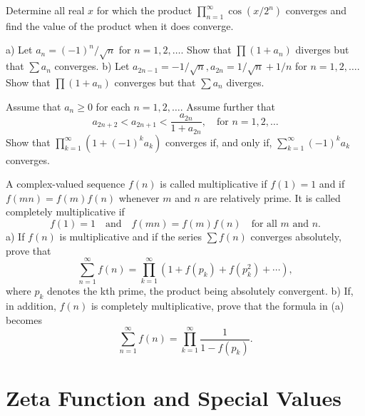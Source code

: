     \begin{problembox}
    Determine all real \(x\) for which the product \(\prod_{n=1}^{\infty} \cos (x/2^n)\) converges and find the value of the product when it does converge.
    \end{problembox}
    
    \begin{problembox}
    a) Let \(a_n = (-1)^n/\sqrt{n}\) for \(n = 1, 2, \ldots\). Show that \(\prod (1 + a_n)\) diverges but that \(\sum a_n\) converges.
    b) Let \(a_{2n-1} = -1/\sqrt{n}, a_{2n} = 1/\sqrt{n} + 1/n\) for \(n = 1, 2, \ldots\). Show that \(\prod (1 + a_n)\) converges but that \(\sum a_n\) diverges.
    \end{problembox}
    
    \begin{problembox}
    Assume that \(a_n \geq 0\) for each \(n = 1, 2, \ldots\). Assume further that
    \[a_{2n+2} < a_{2n+1} < \frac{a_{2n}}{1 + a_{2n}}, \quad \text{for } n = 1, 2, \ldots\]
    Show that \(\prod_{k=1}^{\infty} (1 + (-1)^k a_k)\) converges if, and only if, \(\sum_{k=1}^{\infty} (-1)^k a_k\) converges.
    \end{problembox}
    
    \begin{problembox}
    A complex-valued sequence \(f(n)\) is called multiplicative if \(f(1) = 1\) and if \(f(mn) = f(m)f(n)\) whenever \(m\) and \(n\) are relatively prime. It is called completely multiplicative if
    \[f(1) = 1 \quad \text{and} \quad f(mn) = f(m)f(n) \quad \text{for all } m \text{ and } n.\]
    a) If \(f(n)\) is multiplicative and if the series \(\sum f(n)\) converges absolutely, prove that
    \[\sum_{n=1}^{\infty} f(n) = \prod_{k=1}^{\infty} (1 + f(p_k) + f(p_k^2) + \cdots),\]
    where \(p_k\) denotes the kth prime, the product being absolutely convergent.
    b) If, in addition, \(f(n)\) is completely multiplicative, prove that the formula in (a) becomes
    \[\sum_{n=1}^{\infty} f(n) = \prod_{k=1}^{\infty} \frac{1}{1 - f(p_k)}.\]
    \end{problembox}

\section{Zeta Function and Special Values}

